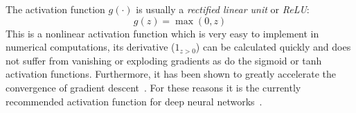 The activation function $g(\cdot)$ is usually a \emph{rectified linear unit} or \emph{ReLU}:
\begin{equation}
	g(z) = \max(0,z)
\end{equation}
This is a nonlinear activation function which is very easy to implement in numerical computations, its derivative ($1_{z>0}$) can be calculated quickly and does not suffer from vanishing or exploding gradients as do the sigmoid or tanh activation functions. Furthermore, it has been shown to greatly accelerate the convergence of gradient descent~\cite{Krizhevsky2012}. For these reasons it is the currently recommended activation function for deep neural networks~\cite{Karpathy2015}.

